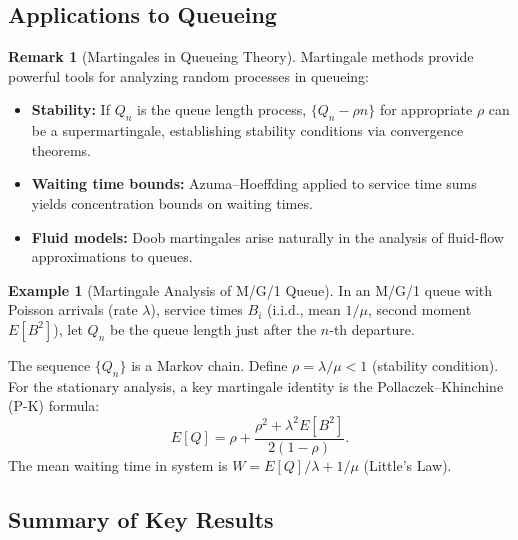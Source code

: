 \documentclass[12pt, a4paper]{article}
\theoremstyle{definition}
\newtheorem{example}{Example}[section]
\newtheorem{remark}{Remark}[section]
\theoremstyle{plain}
\begin{document}
\subsection{Applications to Queueing}

\begin{remark}[Martingales in Queueing Theory]
Martingale methods provide powerful tools for analyzing random processes in queueing:
\begin{itemize}
  \item \textbf{Stability:} If $Q_n$ is the queue length process, $\{Q_n - \rho n\}$ for appropriate $\rho$ can be a supermartingale, establishing stability conditions via convergence theorems.
  \item \textbf{Waiting time bounds:} Azuma--Hoeffding applied to service time sums yields concentration bounds on waiting times.
  \item \textbf{Fluid models:} Doob martingales arise naturally in the analysis of fluid-flow approximations to queues.
\end{itemize}
\end{remark}

\begin{example}[Martingale Analysis of M/G/1 Queue]
In an M/G/1 queue with Poisson arrivals (rate $\lambda$), service times $B_i$ (i.i.d., mean $1/\mu$, second moment $E[B^2]$), let $Q_n$ be the queue length just after the $n$-th departure.

The sequence $\{Q_n\}$ is a Markov chain. Define $\rho = \lambda/\mu < 1$ (stability condition). For the stationary analysis, a key martingale identity is the Pollaczek--Khinchine (P-K) formula:
\[
  E[Q] = \rho + \frac{\rho^2 + \lambda^2 E[B^2]}{2(1-\rho)}.
\]
The mean waiting time in system is $W = E[Q]/\lambda + 1/\mu$ (Little's Law).
\end{example}

\subsection{Summary of Key Results}
\end{document}
